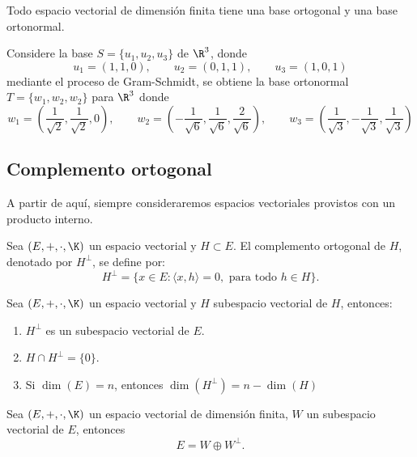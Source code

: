 \documentclass[a4,11pt]{aleph-notas}
\begin{document}
\begin{teo}
    Todo espacio vectorial de dimensión finita tiene una base ortogonal y una base ortonormal.
\end{teo}


\begin{ejem}
    Considere la base $S = \{u_1, u_2, u_3\}$ de $\R^3$, donde 
    \[
        u_1 = (1,1,0), \qquad u_2 = (0, 1,1), \qquad u_3 = (1,0,1)
    \]
    mediante el proceso de Gram-Schmidt, se obtiene la base ortonormal $T=\{w_1, w_2, w_2\}$ para $\R^3$ donde
    \[
        w_1 = \left(\dfrac{1}{\sqrt{2}},\dfrac{1}{\sqrt{2}},0\right), \qquad
        w_2 = \left(-\dfrac{1}{\sqrt{6}},\dfrac{1}{\sqrt{6}},
        \dfrac{2}{\sqrt{6}}\right), \qquad
        w_3 = \left(\dfrac{1}{\sqrt{3}},-\dfrac{1}{\sqrt{3}},
        \dfrac{1}{\sqrt{3}}\right)
    \]
\end{ejem}

\subsection{Complemento ortogonal}

A partir de aquí, siempre consideraremos espacios vectoriales provistos con un producto interno.

\begin{defi}
    Sea $(E,+,\cdot,\K)$ un espacio vectorial y
    $H \subset E$. El complemento ortogonal de $H$, denotado por $H^\perp$, se define por:
    \[
        H^\perp = \{ x \in E: \langle x, h \rangle = 0, \text{ para todo } h \in H\}.
    \]
\end{defi}

\begin{teo}
    Sea $(E,+,\cdot,\K)$ un espacio vectorial y
    $H$ subespacio vectorial de $H$, entonces:
    \begin{enumerate}
        \item $H^\perp$ es un subespacio vectorial de $E$.
        \item $H \cap H^\perp = \{0\}$.
        \item Si $\dim(E) = n$, entonces $\dim(H^\perp) = n - \dim(H)$
    \end{enumerate}
\end{teo}


\begin{teo}
    Sea $(E,+,\cdot,\K)$ un espacio vectorial de dimensión finita, $W$ un subespacio vectorial de $E$, entonces 
    \[
    E = W \oplus W^\perp.
    \]
\end{teo}
\end{document}
